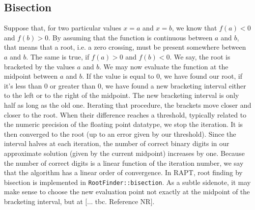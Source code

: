 \subsection{Bisection}
Suppose that, for two particular values $x=a$ and $x=b$, we know that $f(a)<0$ and $f(b)>0$. By assuming that the function is continuous between $a$ and $b$, that means that a root, i.e. a zero crossing, must be present somewhere between $a$ and $b$. The same is true, if $f(a)>0$ and $f(b)<0$. We say, the root is bracketed by the values $a$ and $b$. We may now evaluate the function at the midpoint between $a$ and $b$. If the value is equal to $0$, we have found our root, if it's less than $0$ or greater than $0$, we have found a new bracketing interval either to the left or to the right of the midpoint. The new bracketing interval is only half as long as the old one. Iterating that procedure, the brackets move closer and closer to the root. When their difference reaches a threshold, typically related to the numeric precision of the floating point datatype, we stop the iteration. It is then converged to the root (up to an error given by our threshold). Since the interval halves at each iteration, the number of correct binary digits in our approximate solution (given by the current midpoint) increases by one. Because the number of correct digits is a linear function of the iteration number, we say that the algorithm has a linear order of convergence. In RAPT, root finding by bisection is implemented in \texttt{RootFinder::bisection}. As a subtle sidenote, it may make sense to choose the new evaluation point not exactly at the midpoint of the bracketing interval, but at [... tbc. Reference NR].

